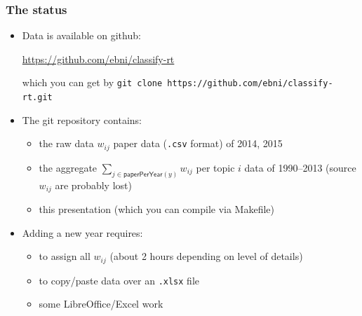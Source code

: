 \documentclass[ignorenonframetext,mathserif]{beamer} %
\begin{document}
  

\begin{frame}[fragile]
  \frametitle{The status}

  \begin{itemize}
  \item Data is available on github:
    \begin{center}
      \url{https://github.com/ebni/classify-rt}
    \end{center}
    which you can get by
    \verb|git clone https://github.com/ebni/classify-rt.git|
  \end{itemize}
  \begin{itemize}
  \item The git repository contains:
    \begin{itemize}
    \item the raw data $w_{ij}$ paper data (\texttt{.csv} format) of
      2014, 2015
    \item the aggregate $\sum_{j\in\mathsf{paperPerYear}(y)}w_{ij}$
      per topic $i$ data of 1990--2013 (source $w_{ij}$ are probably
      lost)
    \item this presentation (which you can compile via Makefile)
    \end{itemize}
  \item Adding a new year requires:
    \begin{itemize}
    \item to assign all $w_{ij}$ (about 2 hours depending on level of details)
    \item to copy/paste data over an \texttt{.xlsx} file 
    \item some LibreOffice/Excel work
    \end{itemize}
  \end{itemize}
\end{frame}
\end{document}

